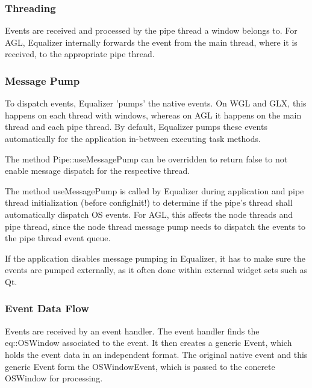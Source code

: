 \documentclass[10pt,a4]{scrartcl}
\begin{document}
\subsubsection{Threading}

Events are received and processed by the pipe thread a window belongs
to. For AGL, Equalizer internally forwards the event from the main
thread, where it is received, to the appropriate pipe thread.

\subsubsection{\label{sMessagePump}Message Pump}

To dispatch events, Equalizer 'pumps' the native events. On WGL and GLX,
this happens on each thread with windows, whereas on AGL it happens on
the main thread and each pipe thread. By default, Equalizer pumps these
events automatically for the application in-between executing task
methods.

The method \textsf{Pipe::useMessagePump} can be overridden to return
\textsf{false} to not enable message dispatch for the respective thread.

The method \textsf{useMessagePump} is called by Equalizer during
application and pipe thread initialization (before configInit!) to
determine if the pipe's thread shall automatically dispatch OS
events. For AGL, this affects the node threads and pipe thread, since
the node thread message pump needs to dispatch the events to the pipe
thread event queue.

If the application disables message pumping in Equalizer, it has to make
sure the events are pumped externally, as it often done within external
widget sets such as Qt.

\subsubsection{Event Data Flow}

Events are received by an event handler. The event handler finds the
\textsf{eq::OSWindow} associated to the event. It then creates a generic
\textsf{Event}, which holds the event data in an independent
format. The original native event and this generic \textsf{Event}
form the \textsf{OSWindowEvent}, which is passed to the concrete
\textsf{OSWindow} for processing.
\end{document}
